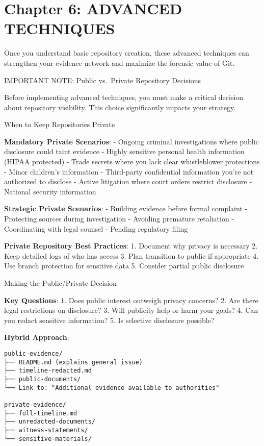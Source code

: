 \section{Chapter 6: ADVANCED
TECHNIQUES}\label{chapter-6-advanced-techniques}

Once you understand basic repository creation, these advanced techniques
can strengthen your evidence network and maximize the forensic value of
Git.

IMPORTANT NOTE: Public vs.~Private Repository Decisions

Before implementing advanced techniques, you must make a critical
decision about repository visibility. This choice significantly impacts
your strategy.

When to Keep Repositories Private

\textbf{Mandatory Private Scenarios}: - Ongoing criminal investigations
where public disclosure could taint evidence - Highly sensitive personal
health information (HIPAA protected) - Trade secrets where you lack
clear whistleblower protections - Minor children's information -
Third-party confidential information you're not authorized to disclose -
Active litigation where court orders restrict disclosure - National
security information

\textbf{Strategic Private Scenarios}: - Building evidence before formal
complaint - Protecting sources during investigation - Avoiding premature
retaliation - Coordinating with legal counsel - Pending regulatory
filing

\textbf{Private Repository Best Practices}: 1. Document why privacy is
necessary 2. Keep detailed logs of who has access 3. Plan transition to
public if appropriate 4. Use branch protection for sensitive data 5.
Consider partial public disclosure

Making the Public/Private Decision

\textbf{Key Questions}: 1. Does public interest outweigh privacy
concerns? 2. Are there legal restrictions on disclosure? 3. Will
publicity help or harm your goals? 4. Can you redact sensitive
information? 5. Is selective disclosure possible?

\textbf{Hybrid Approach}:

\begin{verbatim}
public-evidence/
├── README.md (explains general issue)
├── timeline-redacted.md
├── public-documents/
└── Link to: "Additional evidence available to authorities"

private-evidence/
├── full-timeline.md
├── unredacted-documents/
├── witness-statements/
└── sensitive-materials/
\end{verbatim}

